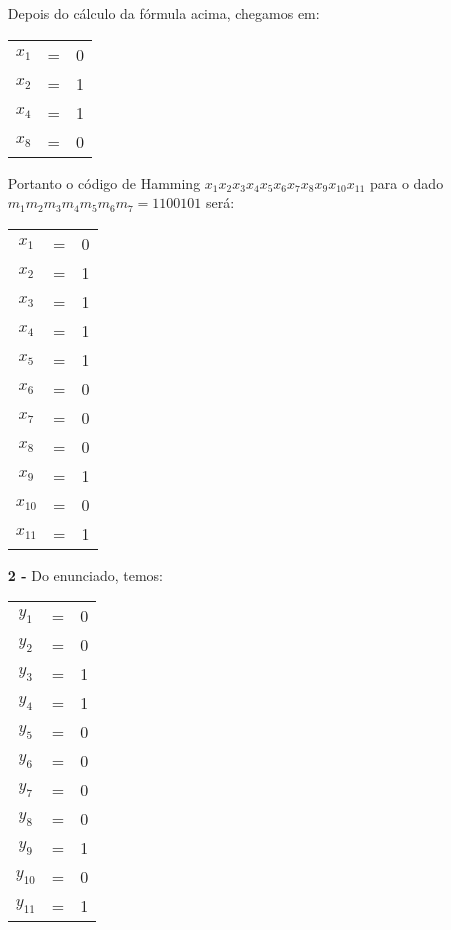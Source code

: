 \documentclass[12pt]{article}
\begin{document}
\begin{itemize}
			Depois do cálculo da fórmula acima, chegamos em:
			\begin{center}
				\begin{tabular}{ccl}
					$x_1$ & = & 0\\
					$x_2$ & = & 1\\
					$x_4$ & = & 1\\
					$x_8$ & = & 0\\
				\end{tabular}
			\end{center}
			Portanto o código de Hamming $x_1x_2x_3x_4x_5x_6x_7x_8x_9x_{10}x_{11}$ para 
			o dado $m_1m_2m_3m_4m_5m_6m_7 = 1100101$ será:
			\begin{center}
				\begin{tabular}{ccc}
					$x_1$ & = & 0\\
					$x_2$ & = & 1\\
					$x_3$ & = & 1 \\
					$x_4$ & = & 1\\
					$x_5$ & = & 1\\
					$x_6$ & = & 0\\
					$x_7$ & = & 0\\
					$x_8$ & = & 0\\
					$x_9$ & = & 1\\
					$x_{10}$ & = & 0\\
					$x_{11}$ & = & 1\\
				\end{tabular}
			\end{center}
		\newpage
		\item[\textbf{2 -}]
			\hfill\newline
			Do enunciado, temos:
			\begin{center}
				\begin{tabular}{ccc}
					$y_1$ & = & 0\\
					$y_2$ & = & 0\\
					$y_3$ & = & 1\\
					$y_4$ & = & 1\\
					$y_5$ & = & 0\\
					$y_6$ & = & 0\\
					$y_7$ & = & 0\\
					$y_8$ & = & 0\\
					$y_9$ & = & 1\\
					$y_{10}$ & = & 0\\
					$y_{11}$ & = & 1\\
				\end{tabular}
			\end{center}

\end{itemize}
\end{document}
